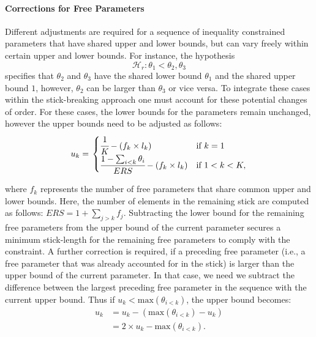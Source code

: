 \begin{appendix}
\hypertarget{corrections-for-free-parameters}{%
\paragraph{Corrections for Free
Parameters}\label{corrections-for-free-parameters}}

Different adjustments are required for a sequence of inequality
constrained parameters that have shared upper and lower bounds, but can
vary freely within certain upper and lower bounds. For instance, the
hypothesis \[\mathcal{H}_r: \theta_1 < \theta_2, \theta_3\] specifies
that \(\theta_2\) and \(\theta_3\) have the shared lower bound
\(\theta_1\) and the shared upper bound \(1\), however, \(\theta_2\) can
be larger than \(\theta_3\) or vice versa. To integrate these cases
within the stick-breaking approach one must account for these potential
changes of order. For these cases, the lower bounds for the parameters
remain unchanged, however the upper bounds need to be adjusted as
follows: \begin{align}
  u_k = \left.
  \begin{cases}
      \cfrac{1}{K} - (f_k \times l_k) & \text{if } k = 1 \\
      \cfrac{1 - \sum_{i < k} \theta_i}{ERS} - (f_k \times l_k) & \text{if } 1 < k < K,
  \end{cases}
    \right.
\end{align}

where \(f_k\) represents the number of free parameters that share common
upper and lower bounds. Here, the number of elements in the remaining
stick are computed as follows: \(ERS = 1 + \sum_{j > k} f_j\).
Subtracting the lower bound for the remaining free parameters from the
upper bound of the current parameter secures a minimum stick-length for
the remaining free parameters to comply with the constraint. A further
correction is required, if a preceding free parameter (i.e., a free
parameter that was already accounted for in the stick) is larger than
the upper bound of the current parameter. In that case, we need we
subtract the difference between the largest preceding free parameter in
the sequence with the current upper bound. Thus if
\(u_k < \text{max}(\theta_{i < k})\), the upper bound becomes:
\begin{align}
u_k &= u_k - (\text{max}(\theta_{i < k}) - u_k)\\
    &= 2 \times u_k - \text{max}(\theta_{i < k}).
\end{align}


\end{appendix}
